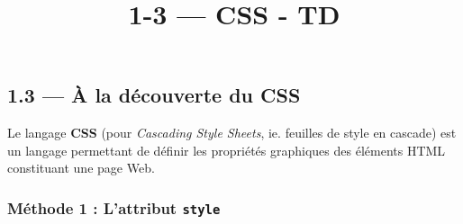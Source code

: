 \documentclass[a4paper,17pt]{extarticle}
\title{1-3 --- CSS - TD}
\begin{document}
    
    

    
    

    
    \hypertarget{uxe0-la-duxe9couverte-du-css}{%
\subsection{1.3 --- À la découverte du
CSS}\label{uxe0-la-duxe9couverte-du-css}}

    Le langage \textbf{CSS} (pour \emph{Cascading Style Sheets}, ie.
feuilles de style en cascade) est un langage permettant de définir les
propriétés graphiques des éléments HTML constituant une page Web.

    \hypertarget{muxe9thode-1-lattribut-style}{%
\subsubsection{\texorpdfstring{Méthode 1 : L'attribut
\texttt{style}}{Méthode 1 : L'attribut style}}\label{muxe9thode-1-lattribut-style}}
\end{document}
